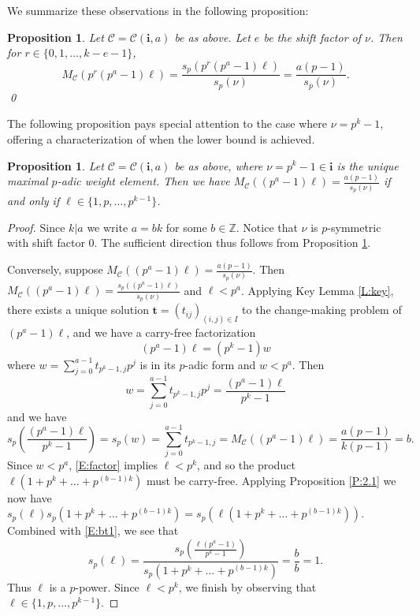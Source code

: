 \documentclass{amsart}
\numberwithin{equation}{section}
\newcommand{\Z}{\mathbb{Z}}
\newcommand{\cC}{\mathcal{C}}
\newcommand{\bi}{\mathbf{i}}
\newcommand{\bt}{\mathbf{t}}
\theoremstyle{plain}
\newtheorem{proposition}[theorem]{Proposition}
\theoremstyle{definition}
\begin{document}
We summarize these observations in the following proposition:

\begin{proposition}
\label{P:3.10}
Let $\cC=\cC(\bi,a)$ be as above.
Let $e$ be the shift factor of $\nu$.
Then for $r \in \{0,1, \dots, k-e-1\}$,
\[
    M_\cC(p^r(p^a-1)\ell) = \frac{s_p(p^r(p^a-1)\ell)}{s_p(\nu)}
    =\frac{a(p-1)}{s_p(\nu)}.
\]
\qed
\end{proposition}
The following proposition pays special attention to the case where
$\nu = p^k-1$, offering a characterization of
when the lower bound is achieved.

\begin{proposition}\label{P:pk-1-case}
Let $\cC=\cC(\bi,a)$ be as above, where
$\nu=p^k-1 \in \bi$ is the unique maximal $p$-adic weight element.
    Then we have 
    $M_\cC((p^a - 1)\ell) = \frac{a(p-1)}{s_p(\nu)}$
    if and only if $\ell\in\{1,p,\ldots,p^{k-1}\}$.
\end{proposition}

\begin{proof}
Since $k|a$ we write $a=bk$ for some $b\in\Z$.
Notice that $\nu$ is $p$-symmetric with shift factor $0$.
The sufficient direction thus follows from Proposition \ref{P:3.10}.
   
    Conversely, suppose $M_\cC((p^a-1)\ell) = \frac{a(p-1)}{s_p(\nu)}$.
    Then 
    $M_\cC((p^a-1)\ell) = \frac{s_p((p^a-1)\ell)}{s_p(\nu)}$ and $\ell<p^a$.
    Applying Key Lemma \ref{L:key}, there exists a unique solution 
    $\bt=(t_{ij})_{(i,j)\in I}$ to the change-making problem of $(p^a-1)\ell$,
    and we have a carry-free factorization
    \begin{equation}\label{E:factor}
       (p^a - 1)\ell = (p^k-1)w
    \end{equation}
    where $w=\sum_{j=0}^{a-1}t_{p^k-1,j}p^j$ is in its $p$-adic form and $w<p^a$.
    Then
    \[
        w=\sum_{j=0}^{a-1} t_{p^k - 1, j} p^j=\frac{(p^a - 1)\ell}{p^k-1}
    \]
    and we have
    \begin{equation}\label{E:bt1}
      s_p\left(\frac{(p^a-1)\ell}{p^k-1}\right)
      = s_p(w)=\sum_{j=0}^{a-1}t_{p^k-1,j}=M_{\cC}((p^a-1)\ell)
       = \frac{a(p-1)}{k(p-1)}=b.
    \end{equation}
    Since $w<p^a$, \eqref{E:factor} implies $\ell<p^k$,
    and so the product $\ell (1+p^k+\ldots+p^{(b-1)k})$ must be carry-free. 
    Applying Proposition \ref{P:2.1} we now have 
    $s_p(\ell)s_p(1+p^k+\ldots+p^{(b-1)k})=s_p(\ell(1+p^k+\ldots+p^{(b-1)k}))$. 
    Combined with \eqref{E:bt1}, we see that
    $$s_p(\ell)=\frac{s_p(\frac{\ell(p^a-1)}{p^k-1})}{s_p(1+p^k+\ldots+p^{(b-1)k})}=\frac{b}{b}=1.
   $$ 
   Thus $\ell$ is a $p$-power.
   Since $\ell<p^k$, we finish by observing that
   $\ell\in\{1,p,\ldots,p^{k-1}\}$.
 \end{proof}
\end{document}
